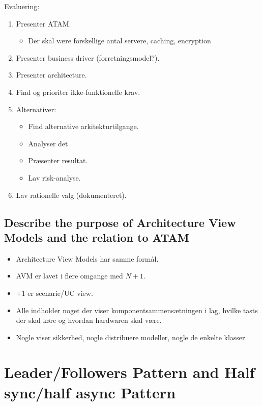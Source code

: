 \documentclass{article}
\begin{document}
Evaluering:
\vspace{-10pt}
\begin{enumerate}
	\item Presenter ATAM.
	\begin{itemize}
		\item Der skal være forskellige antal servere, caching, encryption
	\end{itemize}
	\item Presenter business driver (forretningsmodel?).
	\item Presenter architecture.
	\item Find og prioriter ikke-funktionelle krav.
	\item Alternativer:
	\begin{itemize}
	 	\item Find alternative arkitekturtilgange.	
	 	\item Analyser det
		\item Præsenter resultat.
		\item Lav risk-analyse.
	 \end{itemize} 

	\item Lav rationelle valg (dokumenteret).
\end{enumerate}

\subsection{Describe the purpose of Architecture View Models and the relation to ATAM}

\begin{itemize}
	\item Architecture View Models har samme formål.
	\item AVM er lavet i flere omgange med $N+1$.
	\item $+1$ er scenarie/UC view.
	\item Alle indholder noget der viser komponentsammensætningen i lag, hvilke tasts der skal køre og hvordan hardwaren skal være.
	\item Nogle viser sikkerhed, nogle distribuere modeller, nogle de enkelte klasser.
\end{itemize}











\newpage
\section{Leader/Followers Pattern and Half sync/half async Pattern}
\end{document}
